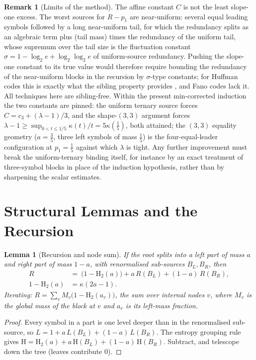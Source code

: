 \documentclass[journal]{IEEEtran}
\newtheorem{lemma}{Lemma}
\theoremstyle{definition}
\newtheorem{remark}{Remark}
\newcommand{\Hh}{\mathrm H_2}
\newcommand{\kp}{\kappa}
\newcommand{\lgg}{\log_2}
\newcommand{\CC}{C}
\newcommand{\lam}{\lambda}
\newcommand{\cthree}{c_3}
\begin{document}
\begin{remark}[Limits of the method]\label{rem:limits}
The affine constant $\CC$ is not the least slope-one excess. The worst sources
for $R-p_1$ are near-uniform: several equal leading symbols followed by a long
near-uniform tail, for which the redundancy splits as an algebraic term plus
(tail mass) times the redundancy of the uniform tail, whose supremum over the
tail size is the fluctuation constant $\sigma=1-\lgg e+\lgg\lgg e$ of
uniform-source redundancy. Pushing the slope-one constant to its true value
would therefore require bounding the redundancy of the near-uniform blocks in
the recursion by $\sigma$-type constants; for Huffman codes this is exactly what
the sibling property provides \cite{Gallager78}, and Fano codes lack it. All
techniques here are sibling-free. Within the present min-corrected induction the
two constants are pinned: the uniform ternary source forces
$\CC=\cthree+(\lam-1)/3$, and the shape-$(3,3)$ argument forces
$\lam-1\ge\sup_{0<t\le1/5}\kp(t)/t=5\kp(\tfrac15)$, both attained; the $(3,3)$
equality geometry ($a=\tfrac35$, three left symbols of mass $\tfrac15$) is the
four-equal-leader configuration at $p_1=\tfrac15$ against which $\lam$ is tight.
Any further improvement must break the uniform-ternary binding itself, for
instance by an exact treatment of three-symbol blocks in place of the induction
hypothesis, rather than by sharpening the scalar estimates.
\end{remark}

\appendices

\section{Structural Lemmas and the Recursion}\label{sec:tools}

\begin{lemma}[Recursion and node sum]\label{lem:rec}
If the root splits into a left part of mass $a$ and right part of mass $1-a$,
with renormalised sub-sources $B_L,B_R$, then
\[
\begin{aligned}
  R\ &=\ \bigl(1-\Hh(a)\bigr)+a\,R(B_L)+(1-a)\,R(B_R),\\
  1-\Hh(a)&=\kp(2a-1).
\end{aligned}
\]
Iterating: $R=\sum_{v}M_v\bigl(1-\Hh(a_v)\bigr)$, the sum over internal nodes
$v$, where $M_v$ is the global mass of the block at $v$ and $a_v$ is its
left-mass fraction.
\end{lemma}

\begin{proof}
Every symbol in a part is one level deeper than in the renormalised sub-source, so
$L=1+a\,L(B_L)+(1-a)\,L(B_R)$. The entropy grouping rule gives
$\mathrm H=\Hh(a)+a\,\mathrm H(B_L)+(1-a)\,\mathrm H(B_R)$. Subtract, and telescope down the tree
(leaves contribute $0$).
\end{proof}
\end{document}
